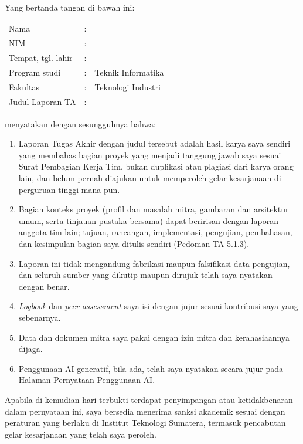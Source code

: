 \begingroup
\setlength{\parindent}{0pt}
Yang bertanda tangan di bawah ini:

\begin{tabular}{@{}l@{\ }l@{\ }p{}@{}}
	Nama & : & \theauthor\\
	NIM & : & \printnim\\
	Tempat, tgl. lahir & : & \printtempatlahir\\
	Program studi & : & Teknik Informatika\\
	Fakultas & : & Teknologi Industri\\
	Judul Laporan TA & : & \thetitle\\
\end{tabular}

menyatakan dengan sesungguhnya bahwa:
\begin{enumerate}
	\item Laporan Tugas Akhir dengan judul tersebut adalah hasil karya saya sendiri yang membahas bagian proyek yang menjadi tanggung jawab saya sesuai Surat Pembagian Kerja Tim, bukan duplikasi atau plagiasi dari karya orang lain, dan belum pernah diajukan untuk memperoleh gelar kesarjanaan di perguruan tinggi mana pun.
	\item Bagian konteks proyek (profil dan masalah mitra, gambaran dan arsitektur umum, serta tinjauan pustaka bersama) dapat beririsan dengan laporan anggota tim lain; tujuan, rancangan, implementasi, pengujian, pembahasan, dan kesimpulan bagian saya ditulis sendiri (Pedoman TA 5.1.3).
	\item Laporan ini tidak mengandung fabrikasi maupun falsifikasi data pengujian, dan seluruh sumber yang dikutip maupun dirujuk telah saya nyatakan dengan benar.
	\item \textit{Logbook} dan \textit{peer assessment} saya isi dengan jujur sesuai kontribusi saya yang sebenarnya.
	\item Data dan dokumen mitra saya pakai dengan izin mitra dan kerahasiaannya dijaga.
	\item Penggunaan AI generatif, bila ada, telah saya nyatakan secara jujur pada Halaman Pernyataan Penggunaan AI.
\end{enumerate}

Apabila di kemudian hari terbukti terdapat penyimpangan atau ketidakbenaran dalam pernyataan ini, saya bersedia menerima sanksi akademik sesuai dengan peraturan yang berlaku di Institut Teknologi Sumatera, termasuk pencabutan gelar kesarjanaan yang telah saya peroleh.

